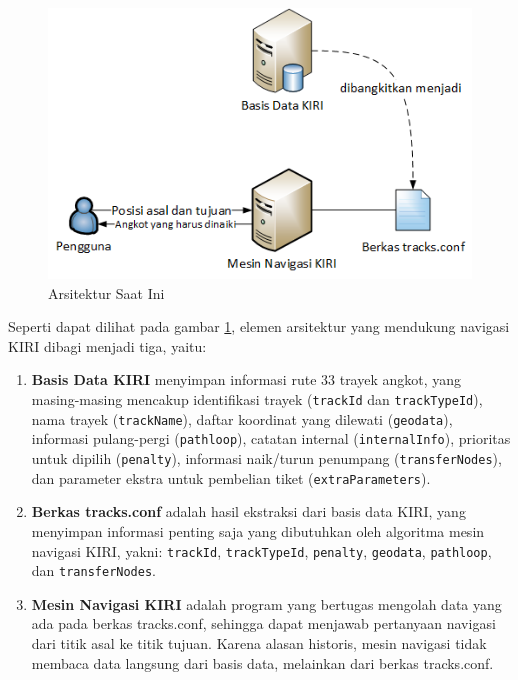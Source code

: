 \begin{figure}
	\centering
	\includegraphics[scale=0.7]{Gambar/2_arsitektur_saat_ini}
	\caption{Arsitektur Saat Ini} 
	\label{fig:2_arsitektur_saat_ini}
\end{figure}

Seperti dapat dilihat pada gambar \ref{fig:2_arsitektur_saat_ini}, elemen
arsitektur yang mendukung navigasi KIRI dibagi menjadi tiga, yaitu:

\begin{enumerate}
	\item \textbf{Basis Data KIRI} menyimpan informasi rute 33 trayek angkot, yang masing-masing mencakup identifikasi trayek (\texttt{trackId} dan \texttt{trackTypeId}), nama trayek (\texttt{trackName}), daftar koordinat yang dilewati (\texttt{geodata}), informasi pulang-pergi (\texttt{pathloop}), catatan internal (\texttt{internalInfo}), prioritas untuk dipilih (\texttt{penalty}), informasi naik/turun penumpang (\texttt{transferNodes}), dan parameter ekstra untuk pembelian tiket (\texttt{extraParameters}).
	\item \textbf{Berkas tracks.conf} adalah hasil ekstraksi dari basis data KIRI, yang menyimpan informasi penting saja yang dibutuhkan oleh algoritma mesin navigasi KIRI, yakni: \texttt{trackId}, \texttt{trackTypeId}, \texttt{penalty}, \texttt{geodata}, \texttt{pathloop}, dan \texttt{transferNodes}.
	\item \textbf{Mesin Navigasi KIRI} adalah program yang bertugas mengolah data yang ada pada berkas tracks.conf, sehingga dapat menjawab pertanyaan navigasi dari titik asal ke titik tujuan. Karena alasan historis, mesin navigasi tidak membaca data langsung dari basis data, melainkan dari berkas tracks.conf.
\end{enumerate}

